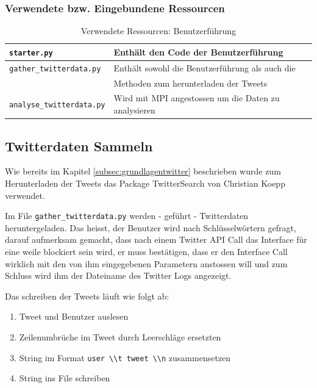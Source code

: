 \subsubsection{Verwendete bzw. Eingebundene Ressourcen}
\begin{table}[H]
\begin{center}
\begin{tabular}{|l|l|}
	\hline
	\lstinline$starter.py$ & Enthält den Code der Benutzerführung \\ \hline
	\lstinline$gather_twitterdata.py$ & Enthält sowohl die Benutzerführung als auch die \\
	& Methoden zum herunterladen der Tweets \\ \hline
	\lstinline$analyse_twitterdata.py$ & Wird mit MPI angestossen um die Daten zu analysieren \\ \hline
\end{tabular}
\caption{Verwendete Ressourcen: Benutzerführung}
\end{center}
\end{table}


\subsection{Twitterdaten Sammeln}
Wie bereits im Kapitel \ref{subsec:grundlagentwitter} beschrieben wurde zum Herunterladen der Tweets das Package TwitterSearch von Christian Koepp\cite{twittersearch} verwendet.

Im File \lstinline$gather_twitterdata.py$ werden - geführt - Twitterdaten heruntergeladen. Das heisst, der Benutzer wird nach Schlüsselwörtern gefragt, darauf aufmerksam gemacht, dass nach einem Twitter API Call das Interface für eine weile blockiert sein wird, er muss bestätigen, dass er den Interface Call wirklich mit den von ihm eingegebenen Parametern anstossen will und zum Schluss wird ihm der Dateiname des Twitter Logs angezeigt.

Das schreiben der Tweets läuft wie folgt ab:
\begin{enumerate}
	\item Tweet und Benutzer auslesen
	\item Zeilenumbrüche im Tweet durch Leerschläge ersetzten
	\item String im Format \lstinline$user \\t tweet \\n$ zusammensetzen
	\item String ins File schreiben 
\end{enumerate}

